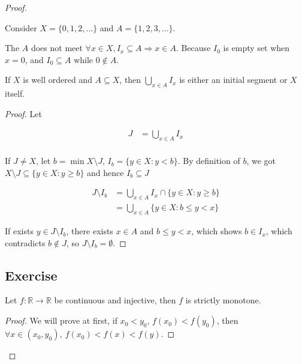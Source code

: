 \begin{proof}
\begin{example}
    Consider $X = \{ 0,1,2, \dots \}$ and $A = \{ 1,2,3, \dots \}$. 

    The $A$ does not meet $\forall x \in X, I_x \subseteq A \Rightarrow x \in A$. Because $I_0$
    is empty set when $x=0$, and $I_0 \subseteq A$ while $0 \notin A$.
\end{example}

\begin{thm}
    If $X$ is well ordered and $A \subseteq X$, then $\bigcup_{x \in A} I_x$
    is either an initial segment or $X$ itself.
\end{thm}

\begin{proof}
    Let 
    
    \begin{align*}
        J &= \bigcup_{x \in A} I_x \\
    \end{align*}

    If $J \ne X$, let $b = \min X \setminus J$, $I_b = \{ y \in X:  y <  b\}$. 
    By definition of $b$, we got $X \setminus J \subseteq \{ y \in X: y \ge b\}$
    and hence $I_b \subseteq J$


        \begin{align*}
            J \setminus I_b &= \bigcup_{x \in A} I_x \cap \{ y \in X: y \ge b\} \\
            &= \bigcup_{x \in A} \{y \in X: b \le y < x\}
        \end{align*}

    If exists $y \in J \setminus I_b$, there exists $x \in A$ and $b \le y < x$, which shows $b \in I_x$, which 
    contradicts $b \notin J$, so $J \setminus I_b = \emptyset$.

\end{proof}

\subsection{Exercise}

\begin{exercise}
    Let $f: \mathbb{R} \to \mathbb{R}$ be continuous and injective, then $f$ is strictly monotone.
\end{exercise}

\begin{proof}
    We will prove at first, if $x_0 < y_0$, $f(x_0) < f(y_0)$, then $\forall x \in (x_0, y_0),\: f(x_0) < f(x) < f(y)$.


\end{proof}
\end{proof}
